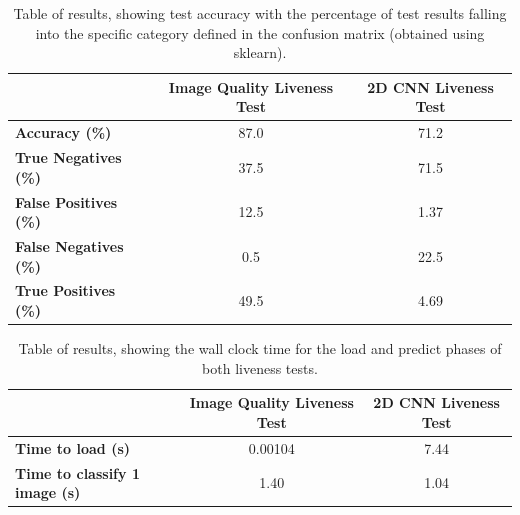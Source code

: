 \documentclass[10pt,a4paper]{article}
\begin{document}
    \begin{table}[ht]
        \centering
        \begin{tabular}[t]{lcc}
            \toprule
             & \textbf{Image Quality Liveness Test} & \textbf{2D CNN Liveness Test}\\
             \midrule
            \textbf{Accuracy (\%)} & 87.0 & 71.2\\
            \midrule
            \textbf{True Negatives (\%)} & 37.5 & 71.5\\
            \textbf{False Positives (\%)} & 12.5 & 1.37\\
            \textbf{False Negatives (\%)} & 0.5 & 22.5\\
            \textbf{True Positives (\%)} & 49.5 & 4.69\\
            \bottomrule
        \end{tabular}
        \caption{Table of results, showing test accuracy with the percentage of test results falling into the specific category defined in the confusion matrix (obtained using sklearn).}
        \label{ResultsTable}
    \end{table}

    \begin{table}[ht]
        \centering
        \begin{tabular}[t]{lcc}
            \toprule
             & \textbf{Image Quality Liveness Test} & \textbf{2D CNN Liveness Test}\\
             \midrule
            \textbf{Time to load (s)} & 0.00104 & 7.44\\
            \textbf{Time to classify 1 image (s)} & 1.40 & 1.04\\
            \bottomrule
        \end{tabular}
        \caption{Table of results, showing the wall clock time for the load and predict phases of both liveness tests.}
        \label{WallClockResultsTime}
    \end{table}
\end{document}
